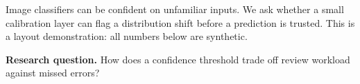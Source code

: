 Image classifiers can be confident on unfamiliar inputs. We ask whether a small calibration layer can flag a distribution shift before a prediction is trusted. This is a layout demonstration: all numbers below are synthetic.

\vspace{5mm}\textbf{Research question.} How does a confidence threshold trade off review workload against missed errors?
